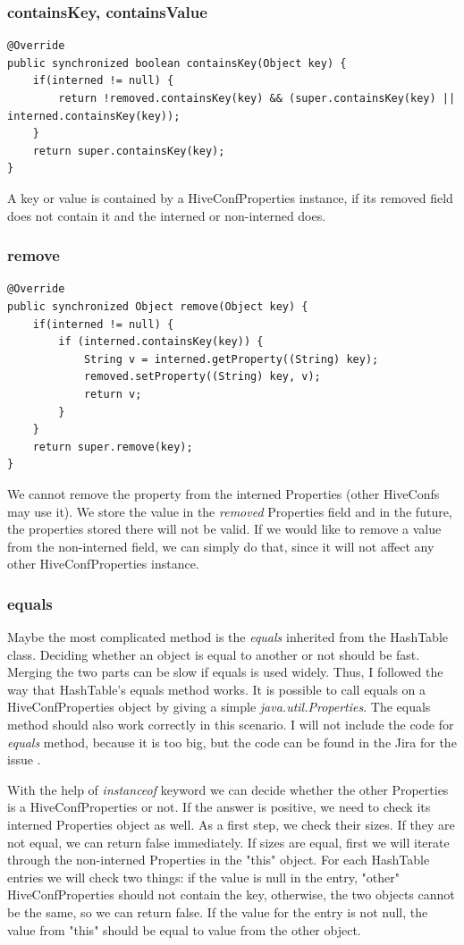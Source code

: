 \subsubsection{containsKey, containsValue}
\begin{lstlisting}
@Override
public synchronized boolean containsKey(Object key) {
	if(interned != null) {
		return !removed.containsKey(key) && (super.containsKey(key) || interned.containsKey(key));
	}
	return super.containsKey(key);
}
\end{lstlisting}
A key or value is contained by a HiveConfProperties instance, if its removed field does not contain it and the interned or non-interned does.

\subsubsection{remove}
\begin{lstlisting}
@Override
public synchronized Object remove(Object key) {
	if(interned != null) {
		if (interned.containsKey(key)) {	
			String v = interned.getProperty((String) key);
			removed.setProperty((String) key, v);
			return v;
		}
	}
	return super.remove(key);
}
\end{lstlisting}
We cannot remove the property from the interned Properties (other HiveConfs may use it). We store the value in the \textit{removed} Properties field and in the future, the properties stored there will not be valid. If we would like to remove a value from the non-interned field, we can simply do that, since it will not affect any other HiveConfProperties instance.

\subsubsection{equals}
Maybe the most complicated method is the \textit{equals} inherited from the HashTable class. Deciding whether an object is equal to another or not should be fast. Merging the two parts can be slow if equals is used widely. Thus, I followed the way that HashTable's equals method works. It is possible to call equals on a HiveConfProperties object by giving a simple \textit{java.util.Properties}. The equals method should also work correctly in this scenario. I will not include the code for \textit{equals} method, because it is too big, but the code can be found in the Jira for the issue \cite{hive-conf}.

With the help of \textit{instanceof} keyword we can decide whether the other Properties is a HiveConfProperties or not. If the answer is positive, we need to check its interned Properties object as well. As a first step, we check their sizes. If they are not equal, we can return false immediately. If sizes are equal, first we will iterate through the non-interned Properties in the "this" object. For each HashTable entries we will check two things: if the value is null in the entry, "other" HiveConfProperties should not contain the key, otherwise, the two objects cannot be the same, so we can return false. If the value for the entry is not null, the value from "this" should be equal to value from the other object. 

